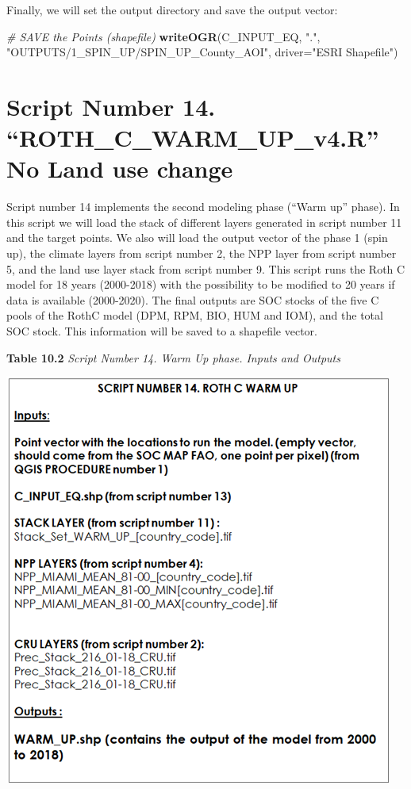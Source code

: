 \documentclass[
  10pt,
  b5paper,
]{book}
\newenvironment{Shaded}{\begin{snugshade}}{\end{snugshade}}
\newcommand{\CommentTok}[1]{\textcolor[rgb]{0.56,0.35,0.01}{\textit{#1}}}
\newcommand{\DataTypeTok}[1]{\textcolor[rgb]{0.13,0.29,0.53}{#1}}
\newcommand{\KeywordTok}[1]{\textcolor[rgb]{0.13,0.29,0.53}{\textbf{#1}}}
\newcommand{\NormalTok}[1]{#1}
\newcommand{\StringTok}[1]{\textcolor[rgb]{0.31,0.60,0.02}{#1}}
\begin{document}
Finally, we will set the output directory and save the output vector:

\begin{Shaded}
\begin{Highlighting}[]
 \CommentTok{# SAVE the Points (shapefile)}
\KeywordTok{writeOGR}\NormalTok{(C_INPUT_EQ, }\StringTok{"."}\NormalTok{, }\StringTok{"OUTPUTS/1_SPIN_UP/SPIN_UP_County_AOI"}\NormalTok{, }\DataTypeTok{driver=}\StringTok{"ESRI Shapefile"}\NormalTok{) }
\end{Highlighting}
\end{Shaded}

\hypertarget{script-number-14.-roth_c_warm_up_v4.r-no-land-use-change}{%
\section{Script Number 14. ``ROTH\_C\_WARM\_UP\_v4.R'' No Land use change}\label{script-number-14.-roth_c_warm_up_v4.r-no-land-use-change}}

Script number 14 implements the second modeling phase (``Warm up'' phase). In this script we will load the stack of different layers generated in script number 11 and the target points. We also will load the output vector of the phase 1 (spin up), the climate layers from script number 2, the NPP layer from script number 5, and the land use layer stack from script number 9. This script runs the Roth C model for 18 years (2000-2018) with the possibility to be modified to 20 years if data is available (2000-2020). The final outputs are SOC stocks of the five C pools of the RothC model (DPM, RPM, BIO, HUM and IOM), and the total SOC stock. This information will be saved to a shapefile vector.

\textbf{Table 10.2} \emph{Script Number 14. Warm Up phase. Inputs and Outputs}

\includegraphics{tables/Table_10.2.png}
\end{document}
